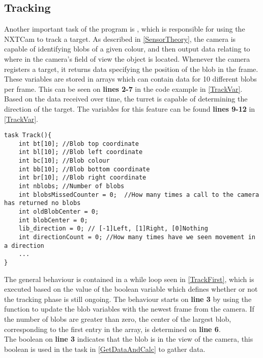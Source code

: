 \subsection{Tracking}
Another important task of the program is , which is responsible
for using the NXTCam to track a target. As described in \autoref{SensorTheory},
the camera is capable of identifying blobs of a given colour, and then output
data relating to where in the camera's field of view the object is located.
Whenever the camera registers a target, it returns data specifying the position
of the blob in the frame. These variables are stored in arrays which can contain
data for 10 different blobs per frame. This can be seen on \textbf{lines 2-7}
in the code example in \autoref{TrackVar}. Based on the data received over time,
the turret is capable of determining the direction of the target. The variables
for this feature can be found \textbf{lines 9-12} in \autoref{TrackVar}.\nl
 
\begin{minipage}[H]{\linewidth}
\begin{lstlisting}[caption = Variables used on the \texttt{Track} task., label
= TrackVar] task Track(){
    int bt[10]; //Blob top coordinate
    int bl[10]; //Blob left coordinate
    int bc[10]; //Blob colour
    int bb[10]; //Blob bottom coordinate
    int br[10]; //Blob right coordinate
    int nblobs; //Number of blobs
    int blobsMissedCounter = 0;  //How many times a call to the camera has returned no blobs
    int oldBlobCenter = 0;
    int blobCenter = 0;
    lib_direction = 0; // [-1]Left, [1]Right, [0]Nothing
    int directionCount = 0; //How many times have we seen movement in a direction
    ...
}
\end{lstlisting}
\end{minipage}

The general behaviour is contained in a while loop seen in \autoref{TrackFirst},
which is executed based on the value of the boolean variable
 which defines whether or not the tracking phase is still
ongoing. The behaviour starts on \textbf{line 3} by using the
 function to update the blob variables with
the newest frame from the camera. If the number of blobs are greater than zero,
the center of the largest blob, corresponding to the first entry in the array,
is determined on \textbf{line 6}.\\ 
The boolean on \textbf{line 3} indicates that the blob is in the view of the
camera, this boolean is used in the  task
in \autoref{GetDataAndCalc} to gather data.\nl
  
